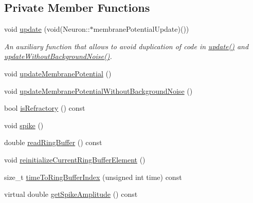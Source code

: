 \subsection*{Private Member Functions}
\begin{DoxyCompactItemize}
\item 
void \hyperlink{classNeuron_a521a967d65a078140cc9c6b8d30240ce}{update} (void(Neuron\-::$\ast$membrane\-Potential\-Update)())
\begin{DoxyCompactList}\small\item\em An auxiliary function that allows to avoid duplication of code in \hyperlink{classNeuron_a782b3b728eee5097ab205a7a7990225b}{update()} and \hyperlink{classNeuron_ababbaa5bc5f7b2e00e0ae5ffcc8fbfdb}{update\-Without\-Background\-Noise()}. \end{DoxyCompactList}\item 
void \hyperlink{classNeuron_a41a81d8527734e59bae39f73fece887f}{update\-Membrane\-Potential} ()
\item 
void \hyperlink{classNeuron_a2a3d0130b76a6e1daa0191b97718178b}{update\-Membrane\-Potential\-Without\-Background\-Noise} ()
\item 
bool \hyperlink{classNeuron_aa40fbb2b025efb1db420da32e16741c1}{is\-Refractory} () const 
\item 
void \hyperlink{classNeuron_a955ecfd2984f75c18664bd370c34af1d}{spike} ()
\item 
double \hyperlink{classNeuron_a763493ef8eff51a638cbb75f0983b828}{read\-Ring\-Buffer} () const 
\item 
void \hyperlink{classNeuron_a41dd9577d84a48bd427201b4b8234150}{reinitialize\-Current\-Ring\-Buffer\-Element} ()
\item 
size\-\_\-t \hyperlink{classNeuron_af1c7b80b5e70e906734ce710d37b1fd7}{time\-To\-Ring\-Buffer\-Index} (unsigned int time) const 
\item 
virtual double \hyperlink{classNeuron_aec2283fbfaba764cd088e6d16b0a74bb}{get\-Spike\-Amplitude} () const 
\end{DoxyCompactItemize}
